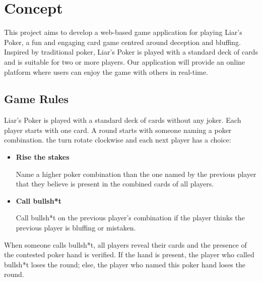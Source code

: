 \documentclass{scrartcl}
\begin{document}

\section{Concept}\label{concept}


This project aims to develop a web-based game application for playing Liar's Poker, a fun and engaging
card game centred around deception and bluffing. Inspired by traditional poker, Liar's Poker is played
with a standard deck of cards and is suitable for two or more players. Our application will provide an
online platform where users can enjoy the game with others in real-time.

\subsection{Game Rules}\label{game-rules}
Liar's Poker is played with a standard deck of cards without any joker. Each player starts with one
card. A round starts with someone naming a poker combination. the turn rotate clockwise and each
next player has a choice:
\begin{itemize}
      \item \textbf{Rise the stakes}\par
            Name a higher poker combination than the one named by the previous player that
            they believe is present in the combined cards of all players.
      \item \textbf{Call bullsh*t} \par
            Call bullsh*t on the previous player's combination if the player thinks the previous
            player is bluffing or mistaken.
\end{itemize}
When someone calls bullsh*t, all players reveal their cards and the presence of the contested poker
hand is verified. If the hand is present, the player who called bullsh*t loses the round; else, the
player who named this poker hand loses the round.
\end{document}
